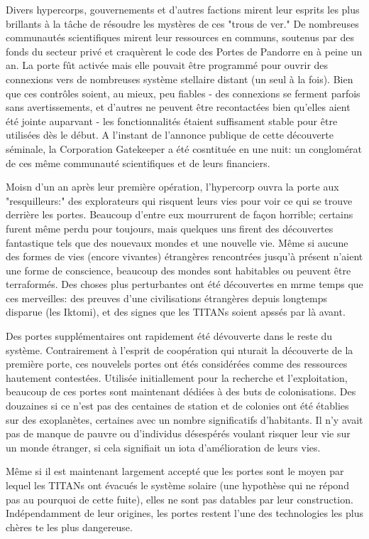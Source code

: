 Divers hypercorps, gouvernements et d'autres factions mirent leur esprits les plus brillants à la tâche de résoudre les mystères de ces "trous de ver." De nombreuses communautés scientifiques mirent leur ressources en communs, soutenus par des fonds du secteur privé et craquèrent le code des Portes de Pandorre en à peine un an. La porte fût activée mais elle pouvait être programmé pour ouvrir des connexions vers de nombreuses système stellaire distant (un seul à la fois). Bien que ces contrôles soient, au mieux, peu fiables - des connexions se ferment parfois sans avertissements, et d'autres ne peuvent être recontactées bien qu'elles aient été jointe auparvant - les fonctionnalités étaient suffisament stable pour être utilisées dès le début. A l'instant de l'annonce publique de cette découverte séminale, la Corporation Gatekeeper a été cosntituée en une nuit: un conglomérat de ces même communauté scientifiques et de leurs financiers. 

Moisn d'un an après leur première opération, l'hypercorp ouvra la porte aux "resquilleurs:" des explorateurs qui risquent leurs vies pour voir ce qui se trouve derrière les portes. Beaucoup d'entre eux mourrurent de façon horrible; certains furent même perdu pour toujours, mais quelques uns firent des découvertes fantastique tels que des nouevaux mondes et une nouvelle vie. Même si aucune des formes de vies (encore vivantes) étrangères rencontrées jusqu'à présent  n'aient une forme de conscience, beaucoup des mondes sont habitables ou peuvent être terraformés. Des choses plus perturbantes ont été découvertes en mrme temps que ces merveilles: des preuves d'une civilisations étrangères depuis longtemps disparue (les Iktomi), et des signes que les TITANs soient apssés par là avant. 

Des portes supplémentaires ont rapidement été dévouverte dans le reste du système. Contrairement à l'esprit de coopération qui nturait la découverte de la première porte, ces nouvelels portes ont étés considérées comme des ressources hautement contestées. Utilisée initiallement pour la recherche et l'exploitation, beaucoup de ces portes sont maintenant dédiées à des buts de colonisations. Des douzaines si ce n'est pas des centaines de station et de colonies ont été établies sur des exoplanètes, certaines avec un nombre significatifs d'habitants. Il n'y avait pas de manque de pauvre ou d'individus désespérés voulant risquer leur vie sur un monde étranger, si cela signifiait un iota d'amélioration de leurs vies. 

Même si il est maintenant largement accepté que les portes sont le moyen par lequel les TITANs ont évacués le système solaire (une hypothèse qui ne répond pas au pourquoi de cette fuite), elles ne sont pas datables par leur construction. Indépendamment de leur origines, les portes restent l'une des technologies les plus chères te les plus dangereuse. 

